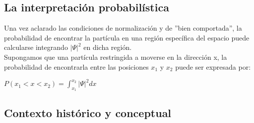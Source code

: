 \documentclass[a4paper]{article}
\begin{document}
    \subsection{La interpretación probabilística}
        \indent Una vez aclarado las condiciones de normalización y de ''bien comportada'', la probabilidad de encontrar la partícula en una región específica del espacio puede calcularse integrando $|\Psi|^2$ en dicha región. \\
        \indent Supongamos que una partícula restringida a moverse en la dirección x, la probabilidad de encontrarla entre las posiciones $x_1$ y $x_2$ puede ser expresada por:

        \begin{center}
            $P(x_1 < x < x_2) = \int_{x_1}^{x_2} |\Psi|^2 dx $
        \end{center}

    \subsection{Contexto histórico y conceptual}
        \indent 
        
\end{document}
